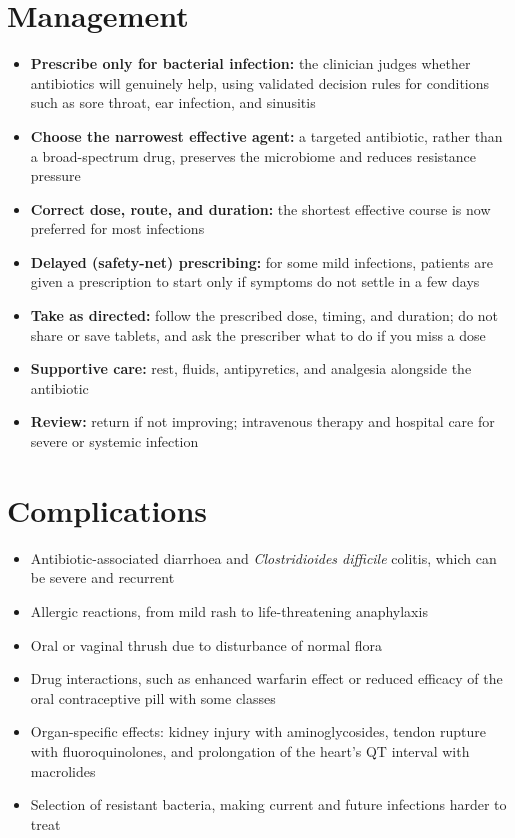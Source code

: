 \section*{Management}
\begin{itemize}
    \item \textbf{Prescribe only for bacterial infection:} the clinician judges whether antibiotics will genuinely help, using validated decision rules for conditions such as sore throat, ear infection, and sinusitis
    \item \textbf{Choose the narrowest effective agent:} a targeted antibiotic, rather than a broad-spectrum drug, preserves the microbiome and reduces resistance pressure
    \item \textbf{Correct dose, route, and duration:} the shortest effective course is now preferred for most infections
    \item \textbf{Delayed (safety-net) prescribing:} for some mild infections, patients are given a prescription to start only if symptoms do not settle in a few days
    \item \textbf{Take as directed:} follow the prescribed dose, timing, and duration; do not share or save tablets, and ask the prescriber what to do if you miss a dose
    \item \textbf{Supportive care:} rest, fluids, antipyretics, and analgesia alongside the antibiotic
    \item \textbf{Review:} return if not improving; intravenous therapy and hospital care for severe or systemic infection
\end{itemize}

\section*{Complications}
\begin{itemize}
    \item Antibiotic-associated diarrhoea and \textit{Clostridioides difficile} colitis, which can be severe and recurrent
    \item Allergic reactions, from mild rash to life-threatening anaphylaxis
    \item Oral or vaginal thrush due to disturbance of normal flora
    \item Drug interactions, such as enhanced warfarin effect or reduced efficacy of the oral contraceptive pill with some classes
    \item Organ-specific effects: kidney injury with aminoglycosides, tendon rupture with fluoroquinolones, and prolongation of the heart's QT interval with macrolides
    \item Selection of resistant bacteria, making current and future infections harder to treat
\end{itemize}

